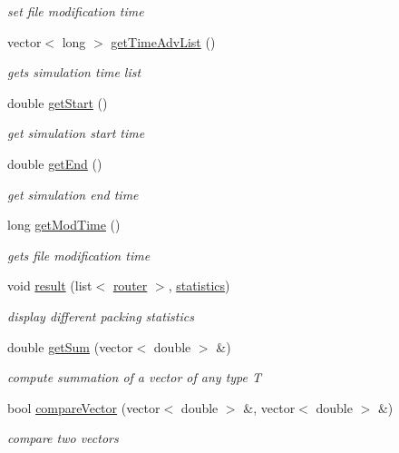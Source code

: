 \begin{DoxyCompactItemize}
\begin{DoxyCompactList}\small\item\em set file modification time \end{DoxyCompactList}\item 
vector$<$ long $>$ \hyperlink{classmeasurement_a6348d9460718925850e77c02b8adeba8}{get\-Time\-Adv\-List} ()
\begin{DoxyCompactList}\small\item\em gets simulation time list \end{DoxyCompactList}\item 
double \hyperlink{classmeasurement_a0c29e12029b98174f084e9485c67c10c}{get\-Start} ()
\begin{DoxyCompactList}\small\item\em get simulation start time \end{DoxyCompactList}\item 
double \hyperlink{classmeasurement_a48411dc4fa236d3101ae2ab4c09eebb6}{get\-End} ()
\begin{DoxyCompactList}\small\item\em get simulation end time \end{DoxyCompactList}\item 
long \hyperlink{classmeasurement_ac7aa8bcfc7395295031be31558494d76}{get\-Mod\-Time} ()
\begin{DoxyCompactList}\small\item\em gets file modification time \end{DoxyCompactList}\item 
void \hyperlink{classmeasurement_a18838caa4a3b08613e822aeb449d91ba}{result} (list$<$ \hyperlink{classrouter}{router} $>$, \hyperlink{classstatistics}{statistics})
\begin{DoxyCompactList}\small\item\em display different packing statistics \end{DoxyCompactList}\item 
double \hyperlink{classmeasurement_ab734bbbfdfa01be67553368501b32189}{get\-Sum} (vector$<$ double $>$ \&)
\begin{DoxyCompactList}\small\item\em compute summation of a vector of any type \-T \end{DoxyCompactList}\item 
bool \hyperlink{classmeasurement_abd3271afad2207cd5db4de16edbf59a3}{compare\-Vector} (vector$<$ double $>$ \&, vector$<$ double $>$ \&)
\begin{DoxyCompactList}\small\item\em compare two vectors \end{DoxyCompactList}\item 

\end{DoxyCompactItemize}
